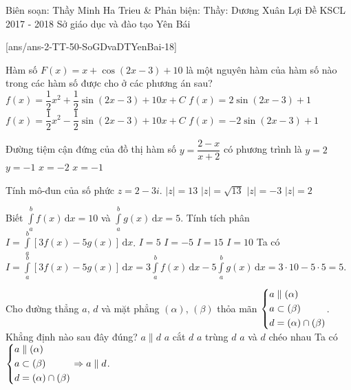 \begin{name}
{Biên soạn: Thầy Minh Ha Trieu \& Phản biện: Thầy: Dương Xuân Lợi}
{Đề KSCL 2017 - 2018 Sở giáo dục và đào tạo Yên Bái}
\end{name}
\setcounter{ex}{0}\setcounter{bt}{0}
[ans/ans-2-TT-50-SoGDvaDTYenBai-18]
\begin{ex}%
	Hàm số $F(x)=x+\cos(2x-3)+10$ là một nguyên hàm của hàm số nào trong các hàm số được cho ở các phương án sau?
	\choice
	{$f(x)=\dfrac{1}{2}x^2+\dfrac{1}{2}\sin(2x-3)+10x+C$}
	{$f(x)=2\sin(2x-3)+1$}
	{$f(x)=\dfrac{1}{2}x^2-\dfrac{1}{2}\sin(2x-3)+10x+C$}
	{\True $f(x)=-2\sin(2x-3)+1$}
\end{ex}

\begin{ex}%
	Đường tiệm cận đứng của đồ thị hàm số $y=\dfrac{2-x}{x+2}$ có phương trình  là
	\choice
	{$y=2$}
	{$y=-1$}
	{\True $x=-2$}
	{$x=-1$}
\end{ex}

\begin{ex}%
	Tính mô-đun của số phức $z=2-3i$.
	\choice
	{$|z|=13$}
	{\True $|z|=\sqrt{13}$}
	{$|z|=-3$}
	{$|z|=2$}
\end{ex}
\begin{ex}%
	Biết $\displaystyle\int\limits_a^bf(x)\mathrm{\, d}x=10$ và $\displaystyle\int\limits_a^bg(x)\mathrm{\, d}x=5$. 
	Tính tích phân $I=\displaystyle\int\limits_a^b[3f(x)-5g(x)]\mathrm{\, d}x$.
	\choice
	{\True $I=5$}
	{$I=-5$}
	{$I=15$}
	{$I=10$}
	\loigiai
	{Ta có $I=\displaystyle\int\limits_a^b[3f(x)-5g(x)]\mathrm{\, d}x
		=3\displaystyle\int\limits_a^bf(x)\mathrm{\, d}x-5\displaystyle\int\limits_a^bg(x)\mathrm{\, d}x=3\cdot 10-5\cdot 5=5$.
	}
\end{ex}

\begin{ex}%
	Cho đường thẳng $a$, $d$ và mặt phẳng $(\alpha)$, $(\beta)$ thỏa mãn $\left\{\begin{aligned}&a\parallel (\alpha)\\&a\subset (\beta)\\&d=(\alpha)\cap (\beta)\end{aligned}\right.$. Khẳng định nào sau đây đúng?
	\choice
	{\True $a\parallel d$}
	{$a$ cắt $d$}
	{$a$ trùng $d$}
	{$a$ và $d$ chéo nhau}
	\loigiai
	{Ta có $\left\{\begin{aligned}&a\parallel (\alpha)\\&a\subset (\beta)\\&d=(\alpha)\cap (\beta)\end{aligned}\right.\Rightarrow a\parallel d$.
	}
\end{ex}


